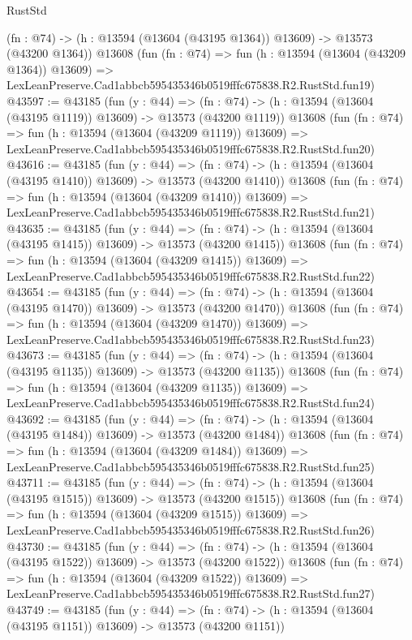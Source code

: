 \begin{lexlean}{RustStd}
\begin{coremodule}
    (fn : @74) -> (h : @13594 (@13604 (@43195 @1364)) @13609) -> @13573 (@43200 @1364))
    @13608
    (fun (fn : @74) =>
    fun (h : @13594 (@13604 (@43209 @1364)) @13609) =>
    LexLeanPreserve.Cad1abbcb595435346b0519fffc675838.R2.RustStd.fun19)
@43597 := @43185
    (fun (y : @44) =>
    (fn : @74) -> (h : @13594 (@13604 (@43195 @1119)) @13609) -> @13573 (@43200 @1119))
    @13608
    (fun (fn : @74) =>
    fun (h : @13594 (@13604 (@43209 @1119)) @13609) =>
    LexLeanPreserve.Cad1abbcb595435346b0519fffc675838.R2.RustStd.fun20)
@43616 := @43185
    (fun (y : @44) =>
    (fn : @74) -> (h : @13594 (@13604 (@43195 @1410)) @13609) -> @13573 (@43200 @1410))
    @13608
    (fun (fn : @74) =>
    fun (h : @13594 (@13604 (@43209 @1410)) @13609) =>
    LexLeanPreserve.Cad1abbcb595435346b0519fffc675838.R2.RustStd.fun21)
@43635 := @43185
    (fun (y : @44) =>
    (fn : @74) -> (h : @13594 (@13604 (@43195 @1415)) @13609) -> @13573 (@43200 @1415))
    @13608
    (fun (fn : @74) =>
    fun (h : @13594 (@13604 (@43209 @1415)) @13609) =>
    LexLeanPreserve.Cad1abbcb595435346b0519fffc675838.R2.RustStd.fun22)
@43654 := @43185
    (fun (y : @44) =>
    (fn : @74) -> (h : @13594 (@13604 (@43195 @1470)) @13609) -> @13573 (@43200 @1470))
    @13608
    (fun (fn : @74) =>
    fun (h : @13594 (@13604 (@43209 @1470)) @13609) =>
    LexLeanPreserve.Cad1abbcb595435346b0519fffc675838.R2.RustStd.fun23)
@43673 := @43185
    (fun (y : @44) =>
    (fn : @74) -> (h : @13594 (@13604 (@43195 @1135)) @13609) -> @13573 (@43200 @1135))
    @13608
    (fun (fn : @74) =>
    fun (h : @13594 (@13604 (@43209 @1135)) @13609) =>
    LexLeanPreserve.Cad1abbcb595435346b0519fffc675838.R2.RustStd.fun24)
@43692 := @43185
    (fun (y : @44) =>
    (fn : @74) -> (h : @13594 (@13604 (@43195 @1484)) @13609) -> @13573 (@43200 @1484))
    @13608
    (fun (fn : @74) =>
    fun (h : @13594 (@13604 (@43209 @1484)) @13609) =>
    LexLeanPreserve.Cad1abbcb595435346b0519fffc675838.R2.RustStd.fun25)
@43711 := @43185
    (fun (y : @44) =>
    (fn : @74) -> (h : @13594 (@13604 (@43195 @1515)) @13609) -> @13573 (@43200 @1515))
    @13608
    (fun (fn : @74) =>
    fun (h : @13594 (@13604 (@43209 @1515)) @13609) =>
    LexLeanPreserve.Cad1abbcb595435346b0519fffc675838.R2.RustStd.fun26)
@43730 := @43185
    (fun (y : @44) =>
    (fn : @74) -> (h : @13594 (@13604 (@43195 @1522)) @13609) -> @13573 (@43200 @1522))
    @13608
    (fun (fn : @74) =>
    fun (h : @13594 (@13604 (@43209 @1522)) @13609) =>
    LexLeanPreserve.Cad1abbcb595435346b0519fffc675838.R2.RustStd.fun27)
@43749 := @43185
    (fun (y : @44) =>
    (fn : @74) -> (h : @13594 (@13604 (@43195 @1151)) @13609) -> @13573 (@43200 @1151))

\end{coremodule}
\end{lexlean}
